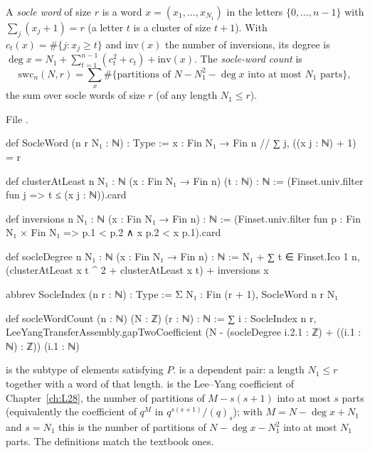 \begin{definition}\label{l29:def:socle}
A \emph{socle word} of size $r$ is a word $x=(x_1,\dots,x_{N_1})$ in the letters $\{0,\dots,n-1\}$ with
$\sum_j(x_j+1)=r$ (a letter $t$ is a cluster of size $t+1$). With $c_t(x)=\#\{j:x_j\ge t\}$ and $\mathrm{inv}(x)$ the
number of inversions, its degree is $\deg x=N_1+\sum_{t=1}^{n-1}(c_t^2+c_t)+\mathrm{inv}(x)$. The \emph{socle-word
count} is
\begin{equation*}
\mathrm{swc}_n(N,r)=\sum_{x}\#\bigl\{\text{partitions of }N-N_1^2-\deg x\text{ into at most }N_1\text{ parts}\bigr\},
\end{equation*}
the sum over socle words of size $r$ (of any length $N_1\le r$).
\end{definition}

\noindent File .
\begin{leancode}
def SocleWord (n r N₁ : ℕ) : Type := {x : Fin N₁ → Fin n // ∑ j, ((x j : ℕ) + 1) = r}

def clusterAtLeast {n N₁ : ℕ} (x : Fin N₁ → Fin n) (t : ℕ) : ℕ :=
  (Finset.univ.filter fun j => t ≤ (x j : ℕ)).card

def inversions {n N₁ : ℕ} (x : Fin N₁ → Fin n) : ℕ :=
  (Finset.univ.filter fun p : Fin N₁ × Fin N₁ => p.1 < p.2 ∧ x p.2 < x p.1).card

def socleDegree {n N₁ : ℕ} (x : Fin N₁ → Fin n) : ℕ :=
  N₁ + ∑ t ∈ Finset.Ico 1 n, (clusterAtLeast x t ^ 2 + clusterAtLeast x t) + inversions x

abbrev SocleIndex (n r : ℕ) : Type := Σ N₁ : Fin (r + 1), SocleWord n r N₁

def socleWordCount (n : ℕ) (N : ℤ) (r : ℕ) : ℕ :=
  ∑ i : SocleIndex n r, LeeYangTransferAssembly.gapTwoCoefficient
    (N - (socleDegree i.2.1 : ℤ) + ((i.1 : ℕ) : ℤ)) (i.1 : ℕ)
\end{leancode}

\begin{dictionary}
 is the subtype of elements satisfying $P$.  is a dependent pair:
a length $N_1\le r$ together with a word of that length.  is the Lee--Yang coefficient of
Chapter~\ref{ch:L28}, the number of partitions of $M-s(s+1)$ into at most $s$ parts (equivalently the coefficient of
$q^M$ in $q^{s(s+1)}/(q)_s$); with $M=N-\deg x+N_1$ and $s=N_1$ this is the number of partitions of $N-\deg x-N_1^2$
into at most $N_1$ parts. The definitions match the textbook ones.
\end{dictionary}

